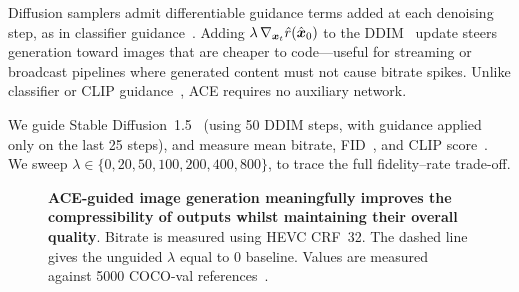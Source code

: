Diffusion samplers admit differentiable guidance terms added at each denoising step, as in classifier guidance~\citep{dhariwal2021diffusion}.
Adding $\lambda\,\nabla_{\boldsymbol{x}_t}\hat{r}(\hat{\boldsymbol{x}}_0)$ to the DDIM~\citep{song2021ddim} update steers generation toward images that are cheaper to code---useful for streaming or broadcast pipelines where generated content must not cause bitrate spikes.
Unlike classifier or CLIP guidance~\citep{mishra2024image}, ACE requires no auxiliary network.

We guide Stable Diffusion~1.5~\citep{rombach2022latent} (using 50 DDIM steps, with guidance applied only on the last 25 steps), and measure mean bitrate, FID~\citep{heusel2017fid}, and CLIP score~\citep{hessel2021clipscore}.
We sweep $\lambda\in\{0,20,50,100,200,400,800\}$, to trace the full fidelity--rate trade-off.

\begin{figure}[ht]
  \centering
  \caption{
  \textbf{ACE-guided image generation meaningfully improves the compressibility of outputs whilst maintaining their overall quality}.
  Bitrate is measured using HEVC CRF~32.
  The dashed line gives the unguided $\lambda$ equal to $0$ baseline.
  Values are measured against 5000 COCO-val references~\citep{lin2014coco}.
  }
  \label{fig:diffguide}
\end{figure}

